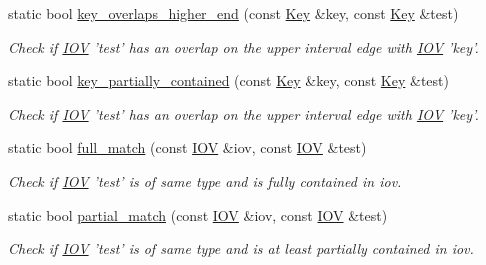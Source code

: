 \begin{DoxyCompactItemize}
static bool \hyperlink{class_d_d4hep_1_1_i_o_v_a2bbff41fece1d4692a155f997fb7aebf}{key\_\-overlaps\_\-higher\_\-end} (const \hyperlink{class_d_d4hep_1_1_i_o_v_a07cb46dc875296dc9cccf4ff370104ae}{Key} \&key, const \hyperlink{class_d_d4hep_1_1_i_o_v_a07cb46dc875296dc9cccf4ff370104ae}{Key} \&test)
\begin{DoxyCompactList}\small\item\em Check if \hyperlink{class_d_d4hep_1_1_i_o_v}{IOV} 'test' has an overlap on the upper interval edge with \hyperlink{class_d_d4hep_1_1_i_o_v}{IOV} 'key'. \item\end{DoxyCompactList}\item 
static bool \hyperlink{class_d_d4hep_1_1_i_o_v_ae2d6950a52f1d51409a19b76385252df}{key\_\-partially\_\-contained} (const \hyperlink{class_d_d4hep_1_1_i_o_v_a07cb46dc875296dc9cccf4ff370104ae}{Key} \&key, const \hyperlink{class_d_d4hep_1_1_i_o_v_a07cb46dc875296dc9cccf4ff370104ae}{Key} \&test)
\begin{DoxyCompactList}\small\item\em Check if \hyperlink{class_d_d4hep_1_1_i_o_v}{IOV} 'test' has an overlap on the upper interval edge with \hyperlink{class_d_d4hep_1_1_i_o_v}{IOV} 'key'. \item\end{DoxyCompactList}\item 
static bool \hyperlink{class_d_d4hep_1_1_i_o_v_aa1b5388443f86ca31d23c99a34f444c5}{full\_\-match} (const \hyperlink{class_d_d4hep_1_1_i_o_v}{IOV} \&iov, const \hyperlink{class_d_d4hep_1_1_i_o_v}{IOV} \&test)
\begin{DoxyCompactList}\small\item\em Check if \hyperlink{class_d_d4hep_1_1_i_o_v}{IOV} 'test' is of same type and is fully contained in iov. \item\end{DoxyCompactList}\item 
static bool \hyperlink{class_d_d4hep_1_1_i_o_v_ab55de0c04c0d06c457e248b4db839b08}{partial\_\-match} (const \hyperlink{class_d_d4hep_1_1_i_o_v}{IOV} \&iov, const \hyperlink{class_d_d4hep_1_1_i_o_v}{IOV} \&test)
\begin{DoxyCompactList}\small\item\em Check if \hyperlink{class_d_d4hep_1_1_i_o_v}{IOV} 'test' is of same type and is at least partially contained in iov. \item\end{DoxyCompactList}\end{DoxyCompactItemize}
